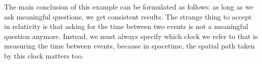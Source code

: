 \documentclass[../relativity_main.tex]{subfiles}
\begin{document}
\begin{ex}

	The main conclusion of this example can be formulated as follows: as long as we ask meaningful questions, we get consistent results. The strange thing to accept in relativity is that asking for the time between two events is not a meaningful question anymore. Instead, we must always specify which clock we refer to that is measuring the time between events, because in spacetime, the spatial path taken by this clock matters too.
\end{ex}
\end{document}

